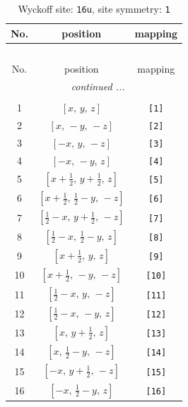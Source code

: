 \documentclass[fleqn,8pt]{jsarticle}
\begin{document}
\begin{longtable}{ccc}
\caption{Wyckoff site: {\tt 16u}, site symmetry: {\tt 1}}
 \\
 \hline \hline
No. & position & mapping \\ \hline \endfirsthead

\multicolumn{2}{l}{\tablename\ \thetable{}} \\
 \hline \hline
No. & position & mapping \\ \hline \endhead

 \hline \hline
\multicolumn{2}{r}{\footnotesize\it continued ...} \\ \endfoot

 \hline \hline
\multicolumn{2}{r}{} \\ \endlastfoot

1 & $\left[ x,\, y,\, z \right]$ & {\tt [1]} \\ \hline
2 & $\left[ x,\, - y,\, - z \right]$ & {\tt [2]} \\ \hline
3 & $\left[ - x,\, y,\, - z \right]$ & {\tt [3]} \\ \hline
4 & $\left[ - x,\, - y,\, z \right]$ & {\tt [4]} \\ \hline
5 & $\left[ x + \frac{1}{2},\, y + \frac{1}{2},\, z \right]$ & {\tt [5]} \\ \hline
6 & $\left[ x + \frac{1}{2},\, \frac{1}{2} - y,\, - z \right]$ & {\tt [6]} \\ \hline
7 & $\left[ \frac{1}{2} - x,\, y + \frac{1}{2},\, - z \right]$ & {\tt [7]} \\ \hline
8 & $\left[ \frac{1}{2} - x,\, \frac{1}{2} - y,\, z \right]$ & {\tt [8]} \\ \hline
9 & $\left[ x + \frac{1}{2},\, y,\, z \right]$ & {\tt [9]} \\ \hline
10 & $\left[ x + \frac{1}{2},\, - y,\, - z \right]$ & {\tt [10]} \\ \hline
11 & $\left[ \frac{1}{2} - x,\, y,\, - z \right]$ & {\tt [11]} \\ \hline
12 & $\left[ \frac{1}{2} - x,\, - y,\, z \right]$ & {\tt [12]} \\ \hline
13 & $\left[ x,\, y + \frac{1}{2},\, z \right]$ & {\tt [13]} \\ \hline
14 & $\left[ x,\, \frac{1}{2} - y,\, - z \right]$ & {\tt [14]} \\ \hline
15 & $\left[ - x,\, y + \frac{1}{2},\, - z \right]$ & {\tt [15]} \\ \hline
16 & $\left[ - x,\, \frac{1}{2} - y,\, z \right]$ & {\tt [16]} \\
\end{longtable}
\end{document}

